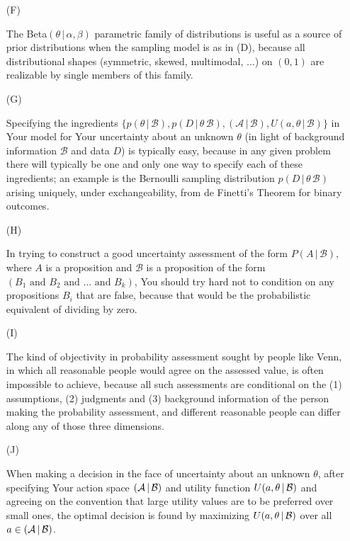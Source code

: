 \documentclass[12pt]{article}
\newcommand{\given}{\, | \,}
\begin{document}
\begin{itemize}
\item[(F)]

The Beta$( \theta \given \alpha, \beta )$ parametric family of distributions is
useful as a source of prior distributions when the sampling model is as in
(D), because all distributional shapes (symmetric, skewed, multimodal, ...)
on $( 0, 1 )$ are realizable by single members of this family.

\item[(G)]

Specifying the ingredients $\{ p ( \theta \given { \mathcal B } ), p ( D \given
\theta \, { \mathcal B } ), ( { \mathcal A \given { \mathcal B } } ), U ( a, \theta \given { \mathcal B } ) \}$ in Your model for Your uncertainty about an unknown $\theta$ (in light of background information $\mathcal B$ and data $D$) is typically easy, because in any given problem there will typically be one and only one way to specify each of these ingredients; an example is the Bernoulli sampling distribution $p ( D \given \theta \, { \mathcal B } )$ arising uniquely, under exchangeability, from de Finetti's Theorem for binary outcomes.

\item[(H)]

In trying to construct a good uncertainty assessment of the form $P ( A \given
\mathcal B )$, where $A$ is a proposition and $\mathcal B$ is a proposition
of the form $( B_1 \textrm{ and } B_2 \textrm{ and } \dots \textrm{ and }
B_k )$, You should try hard not to condition on any propositions $B_i$ that
are false, because that would be the probabilistic equivalent of dividing
by zero.  

\item[(I)]

The kind of objectivity in probability assessment sought by people like
Venn, in which all reasonable people would agree on the assessed value, is
often impossible to achieve, because all such assessments are conditional
on the (1) assumptions, (2) judgments and (3) background information of the
person making the probability assessment, and different reasonable people
can differ along any of those three dimensions.

\item[(J)]

When making a decision in the face of uncertainty about an unknown $\theta$, after specifying Your action space $( { \cal A } \given { \cal B } )$ and utility function $U ( a, \theta \given { \cal B } )$ and agreeing on the convention that large utility values are to be preferred over small ones, the optimal decision is found by maximizing $U ( a, \theta \given { \cal B } )$ over all $a \in ( { \cal A } \given { \cal B } )$.


\end{itemize}
\end{document}
